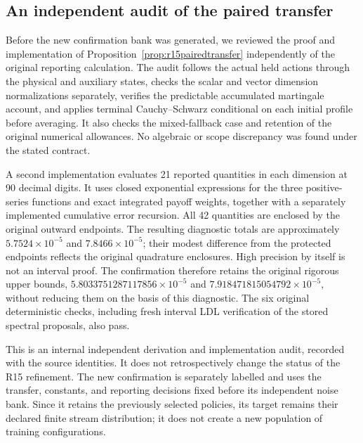 \subsection{An independent audit of the paired transfer}
\label{app:r16pairedaudit}

Before the new confirmation bank was generated, we reviewed the proof and
implementation of Proposition~\ref{prop:r15pairedtransfer} independently
of the original reporting calculation. The audit follows the actual held
actions through the physical and auxiliary states, checks the scalar and
vector dimension normalizations separately, verifies the predictable
accumulated martingale account, and applies terminal Cauchy--Schwarz
conditional on each initial profile before averaging. It also checks
the mixed-fallback case and retention of the original numerical allowances.
No algebraic or scope discrepancy was found under the stated contract.

A second implementation evaluates 21 reported quantities in each dimension
at 90 decimal digits. It uses closed exponential expressions for the three
positive-series functions and exact integrated payoff weights, together
with a separately implemented cumulative error recursion. All 42 quantities
are enclosed by the original outward endpoints. The resulting diagnostic
totals are approximately $5.7524\times10^{-5}$ and
$7.8466\times10^{-5}$; their modest difference from the protected endpoints
reflects the original quadrature enclosures. High precision by itself is
not an interval proof. The confirmation therefore retains the original
rigorous upper bounds, $5.8033751287117856\times10^{-5}$ and
$7.918471815054792\times10^{-5}$, without reducing them on the basis of
this diagnostic. The six original deterministic checks, including fresh
interval LDL verification of the stored spectral proposals, also pass.

This is an internal independent derivation and implementation audit,
recorded with the source identities. It does not retrospectively change
the status of the R15 refinement. The new confirmation is separately
labelled and uses the transfer, constants, and reporting decisions fixed
before its independent noise bank. Since it retains the previously selected
policies, its target remains their declared finite stream distribution;
it does not create a new population of training configurations.
